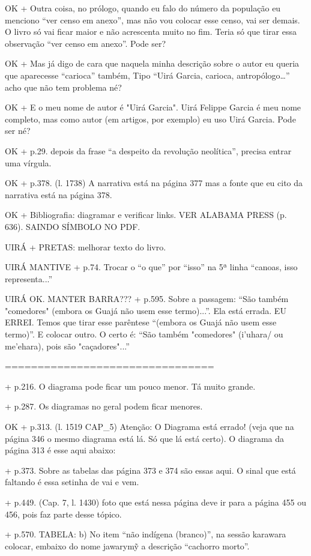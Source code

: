 OK + Outra coisa, no prólogo, quando eu falo do número da população eu menciono “ver censo em anexo”, mas não vou colocar esse censo, vai ser demais. O livro só vai ficar maior e não acrescenta muito no fim. 
Teria só que tirar essa observação “ver censo em anexo”. Pode ser?

OK + Mas já digo de cara que naquela minha descrição sobre o autor eu queria que aparecesse “carioca” também, Tipo “Uirá Garcia, carioca, antropólogo…” acho que não tem problema né?

OK + E o meu nome de autor é "Uirá Garcia". Uirá Felippe Garcia é meu nome completo, mas como autor (em artigos, por exemplo) eu uso Uirá Garcia. Pode ser né?

OK + p.29. depois da frase “a despeito da revolução neolítica”, precisa entrar uma vírgula.

OK + p.378. (l. 1738) A narrativa está na página 377 mas a fonte que eu cito da narrativa está na página 378.

OK + Bibliografia: diagramar e verificar links. VER ALABAMA PRESS (p. 636). SAINDO SÍMBOLO NO PDF.

UIRÁ + PRETAS: melhorar texto do livro.

UIRÁ MANTIVE + p.74. Trocar o “o que” por “isso” na 5ª linha “canoas, isso representa...”

UIRÁ OK. MANTER BARRA??? + p.595. Sobre a passagem: “São também "comedores" (embora os Guajá não usem esse termo)...”. Ela está errada. EU ERREI. Temos que tirar esse parêntese “(embora os Guajá não usem esse termo)”. E colocar outro. O certo é: “São também "comedores" (i’uhara/ ou me’ehara), pois são "caçadores"...”

================================

+ p.216. O diagrama pode ficar um pouco menor. Tá muito grande.

+ p.287. Os diagramas no geral podem ficar menores.

OK + p.313. (l. 1519 CAP_5) Atenção: O Diagrama está errado! (veja que na página 346 o mesmo diagrama está lá. Só que lá está certo). O diagrama da página 313 é esse aqui abaixo:

+ p.373. Sobre as tabelas das página 373 e 374 são essas aqui. O sinal que está faltando é essa setinha de vai e vem.


+ p.449. (Cap. 7, l. 1430) foto que está nessa página deve ir para a página 455 ou 456, pois faz parte desse tópico.

+ p.570. TABELA: 
b) No item “não indígena (branco)”, na sessão karawara colocar, embaixo do nome jawarymỹ a descrição “cachorro morto”.

